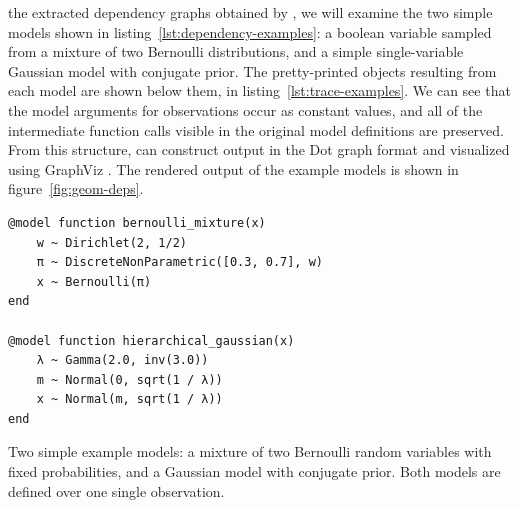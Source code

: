  the extracted dependency graphs obtained by \autogibbsjl{}, we will
examine the two simple models shown in listing~\ref{lst:dependency-examples}: a boolean variable
sampled from a mixture of two Bernoulli distributions, and a simple single-variable Gaussian model
with conjugate prior. The pretty-printed  objects resulting
from each model are shown below them, in listing~\ref{lst:trace-examples}.  We can see that the
model arguments for observations occur as constant values, and all of the intermediate function
calls visible in the original model definitions are preserved.  From this structure, \autogibbsjl{}
can construct output in the Dot graph format and visualized using GraphViz
\parencite{gansner2000open}.  The rendered output of the example models is shown in
figure~\ref{fig:geom-deps}.

\begin{lstfloat}[p]
\begin{lstlisting}[style=lstfloat]
@model function bernoulli_mixture(x)
    w ~ Dirichlet(2, 1/2)
    π ~ DiscreteNonParametric([0.3, 0.7], w)
    x ~ Bernoulli(π)
end

@model function hierarchical_gaussian(x)
    λ ~ Gamma(2.0, inv(3.0))
    m ~ Normal(0, sqrt(1 / λ))
    x ~ Normal(m, sqrt(1 / λ))
end
\end{lstlisting}
  \caption{Two simple example models: a mixture of two Bernoulli random variables with fixed
    probabilities, and a Gaussian model with conjugate prior.  Both models are defined over one
    single observation.}
  \label{lst:dependency-examples}
\end{lstfloat}

